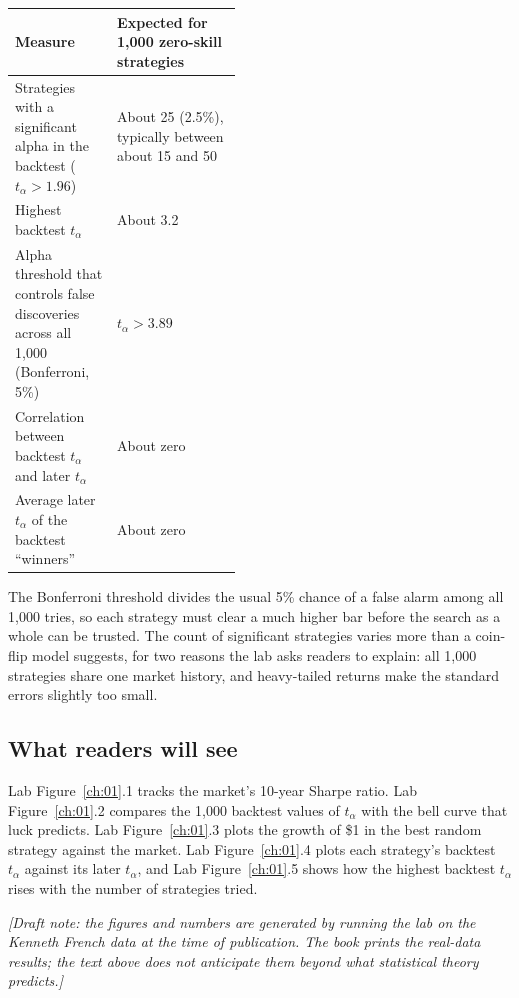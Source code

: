 \begin{center}
\small
\begin{tabularx}{0.9\linewidth}{@{}>{\raggedright\arraybackslash}p{0.450\linewidth}>{\raggedright\arraybackslash}X@{}}
\toprule
Measure & Expected for 1,000 zero-skill strategies \\
\midrule
Strategies with a significant alpha in the backtest ($t_\alpha > 1.96$) & About 25 (2.5\%), typically between about 15 and 50 \\
Highest backtest $t_\alpha$ & About 3.2 \\
Alpha threshold that controls false discoveries across all 1,000 (Bonferroni, 5\%) & $t_\alpha > 3.89$ \\
Correlation between backtest $t_\alpha$ and later $t_\alpha$ & About zero \\
Average later $t_\alpha$ of the backtest ``winners'' & About zero \\
\bottomrule
\end{tabularx}
\end{center}

The Bonferroni threshold divides the usual 5\% chance of a false alarm among all 1,000 tries, so each strategy must clear a much higher bar before the search as a whole can be trusted. The count of significant strategies varies more than a coin-flip model suggests, for two reasons the lab asks readers to explain: all 1,000 strategies share one market history, and heavy-tailed returns make the standard errors slightly too small.

\subsection*{What readers will see}

Lab Figure~\ref{ch:01}.1 tracks the market's 10-year Sharpe ratio. Lab Figure~\ref{ch:01}.2 compares the 1,000 backtest values of $t_\alpha$ with the bell curve that luck predicts. Lab Figure~\ref{ch:01}.3 plots the growth of \$1 in the best random strategy against the market. Lab Figure~\ref{ch:01}.4 plots each strategy's backtest $t_\alpha$ against its later $t_\alpha$, and Lab Figure~\ref{ch:01}.5 shows how the highest backtest $t_\alpha$ rises with the number of strategies tried.

\emph{[Draft note: the figures and numbers are generated by running the lab on the Kenneth French data at the time of publication. The book prints the real-data results; the text above does not anticipate them beyond what statistical theory predicts.]}

